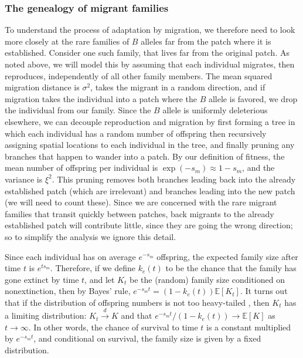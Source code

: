 \documentclass{article}
\newcommand{\E}{\mathbb{E}}
\newcommand{\dconv}{\xrightarrow{d}}
\newcommand{\plr}[1]{{\it\color{blue}(#1)}}
\begin{document}
\subsubsection{The genealogy of migrant families}

To understand the process of adaptation by migration,
we therefore need to look more closely at the rare families of $B$ alleles far from the patch where it is established.
Consider one such family,
that lives far from the original patch.
As noted above, we will model this by assuming that each individual
migrates, then reproduces, independently of all other family members.
The mean squared migration distance is $\sigma^2$, takes the migrant in a random direction,
and if migration takes the individual into a patch where the $B$ allele is favored, 
we drop the individual from our family.
Since the $B$ allele is uniformly deleterious elsewhere,
we can decouple reproduction and migration
by first forming a tree in which each individual has a random number of offspring
then recursively assigning spatial locations to each individual in the tree,
and finally pruning any branches that happen to wander into a patch.
By our definition of fitness, the mean number of offspring per individual is $\exp(-s_m)\approx 1-s_m$,
and the variance is $\xi^2$.
This pruning removes both branches leading back into the already established patch (which are irrelevant)
and branches leading into the new patch (we will need to count these).
Since we are concerned with the rare migrant families that transit quickly between patches, 
back migrants to the already established patch will contribute little, since they are going the wrong direction;
so to simplify the analysis we ignore this detail.  %

Since each individual has on average $e^{-s_m}$ offspring,
the expected family size after time $t$ is $e^{t s_m}$.
Therefore, if we define $k_e(t)$ to be the chance that the family
has gone extinct by time $t$, 
and let $K_t$ be the (random) family size conditioned on nonextinction,
then by Bayes' rule, $e^{-s_m t} = (1-k_e(t))\E[K_t]$.
It turns out that if the distribution of offspring numbers is not too heavy-tailed \citep[see][for details]{jagers1975branching},
then $K_t$ has a limiting distribution: $K_t \dconv K$ 
and that $e^{-s_m t}/(1-k_e(t)) \to \E[K]$ as $t \to \infty$.
In other words, the chance of survival to time $t$ is a constant multiplied by $e^{-s_m t}$,
and conditional on survival, the family size is given by a fixed distribution.
\end{document}
